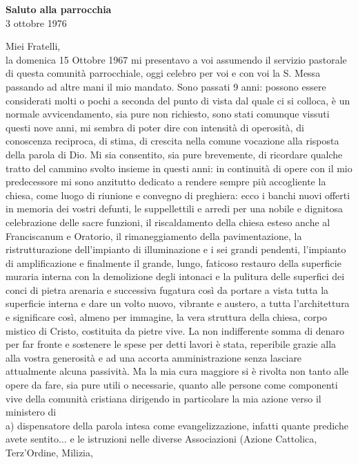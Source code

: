 \begin{flushright}
\textbf{Saluto alla parrocchia}\\[0.25cm]
3 ottobre 1976
\end{flushright}
Miei Fratelli,\\[0.25cm]
la domenica 15 Ottobre 1967 mi presentavo a voi assumendo il servizio pastorale di questa comunità parrocchiale, oggi celebro per voi e con voi la S. Messa passando ad altre mani il mio mandato.
Sono passati 9 anni: possono essere considerati molti o pochi a seconda del punto di vista dal quale ci si colloca, è un normale avvicendamento, sia pure non richiesto, sono stati comunque vissuti 
questi nove anni, mi sembra di poter dire con intensità di operosità, di conoscenza reciproca, di stima, di crescita nella comune vocazione alla risposta della parola di Dio.
Mi sia consentito, sia pure brevemente, di ricordare qualche tratto del cammino svolto insieme in questi anni:
in continuità di opere con il mio predecessore mi sono anzitutto dedicato a rendere sempre più accogliente la chiesa, come luogo di riunione e convegno di preghiera: 
ecco i banchi nuovi offerti in memoria dei vostri defunti, le suppellettili e arredi per una nobile e dignitosa celebrazione delle sacre funzioni, il riscaldamento della chiesa esteso anche al 
Franciscanum e Oratorio, il rimaneggiamento della pavimentazione, la ristrutturazione dell’impianto di illuminazione e i sei grandi pendenti, l’impianto di amplificazione e finalmente
il grande, lungo, faticoso restauro della superficie muraria interna con la demolizione degli intonaci e la pulitura delle superfici dei conci di pietra arenaria e successiva fugatura così
da portare a vista tutta la superficie interna e dare un volto nuovo, vibrante e austero, a tutta l'architettura e significare così, almeno per immagine, la vera struttura della chiesa, corpo
mistico di Cristo, costituita da pietre vive.
La non indifferente somma di denaro per far fronte e sostenere le spese per detti lavori è stata, reperibile grazie alla alla vostra generosità e ad una accorta amministrazione senza lasciare
attualmente alcuna passività.
Ma la mia cura maggiore si è rivolta non tanto alle opere da fare, sia pure utili o necessarie, quanto alle persone come componenti vive della comunità cristiana dirigendo in particolare 
la mia azione verso il ministero di\\
a) dispensatore della parola intesa come evangelizzazione, infatti quante prediche avete sentito... e le istruzioni nelle diverse Associazioni (Azione Cattolica, Terz'Ordine, Milizia, 
